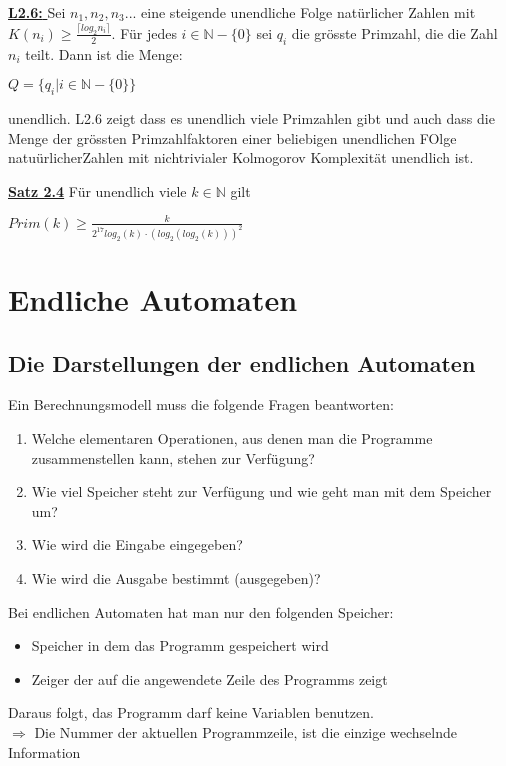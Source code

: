 \documentclass[8pt]{extreport}
\begin{document}
\underline{\textbf{L2.6: }} Sei $n_1,n_2,n_3...$ eine steigende unendliche Folge natürlicher Zahlen mit $K(n_i) \geq \frac{\lceil log_2n_i \rceil}{2}$. Für jedes $i \in \mathbb{N}- \{0\}$ sei $q_i$ die grösste Primzahl, die die Zahl $n_i$ teilt. Dann ist die Menge:
\begin{center}
$Q = \{q_i |i \in \mathbb{N} -\{0\}\}$
\end{center}
unendlich. L2.6 zeigt dass es unendlich viele Primzahlen gibt und auch dass die Menge der grössten Primzahlfaktoren einer beliebigen unendlichen FOlge natuürlicherZahlen mit nichtrivialer Kolmogorov Komplexität unendlich ist. 

\underline{\textbf{Satz 2.4}} Für unendlich viele $k \in \mathbb{N}$ gilt
\begin{center}
$Prim(k) \geq \frac{k}{2^{17}log_2(k) \cdot (log_2(log_2(k)))^2}$
\end{center}

\chapter{Endliche Automaten}

\section{Die Darstellungen der endlichen Automaten}

Ein Berechnungsmodell muss die folgende Fragen beantworten:
\begin{enumerate}
\item Welche elementaren Operationen, aus denen man die Programme zusammenstellen kann, stehen zur Verfügung?
\item Wie viel Speicher steht zur Verfügung und wie geht man mit dem Speicher um?
\item Wie wird die Eingabe eingegeben?
\item Wie wird die Ausgabe bestimmt (ausgegeben)?
\end{enumerate}

Bei endlichen Automaten hat man nur den folgenden Speicher:
\begin{itemize}
\item Speicher in dem das Programm gespeichert wird
\item Zeiger der auf die angewendete Zeile des Programms zeigt
\end{itemize}
Daraus folgt, das Programm darf keine Variablen benutzen.\\
$\Rightarrow$ Die Nummer der aktuellen Programmzeile, ist die einzige wechselnde Information
\end{document}
